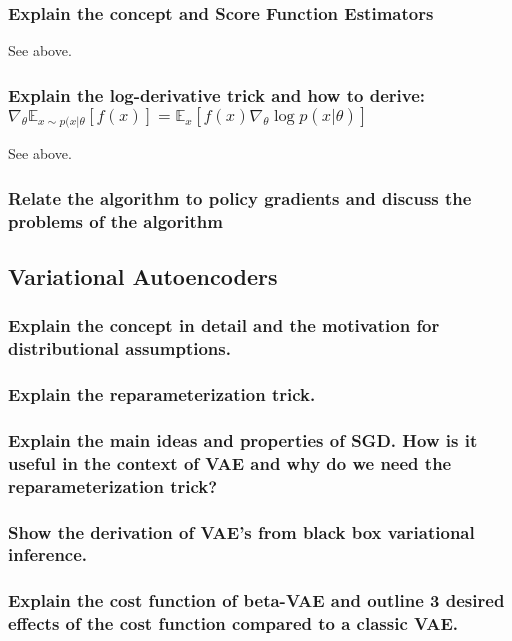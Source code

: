 \documentclass{article}
\newcommand{\E}[2]{\mathbb{E}_{#1}\left[#2\right]}
\begin{document}
\subsubsection{Explain the concept and Score Function Estimators}
See above.

\subsubsection{Explain the log-derivative trick and how to derive:
$\nabla_\theta \E{x \sim p(x|\theta}{f(x)} = \E{x}{f(x) \nabla_\theta \log p(x|\theta)}$}
See above.

\subsubsection{Relate the algorithm to policy gradients and discuss the problems of the algorithm}







\subsection{Variational Autoencoders}

\subsubsection{Explain the concept in detail and the motivation for distributional assumptions.}

\subsubsection{Explain the reparameterization trick.}

\subsubsection{Explain the main ideas and properties of SGD. How is it useful in the context of VAE and why do we need the reparameterization trick?}

\subsubsection{Show the derivation of VAE's from black box variational inference.}

\subsubsection{Explain the cost function of beta-VAE and outline 3 desired effects of the cost function compared to a classic VAE.}
\end{document}
